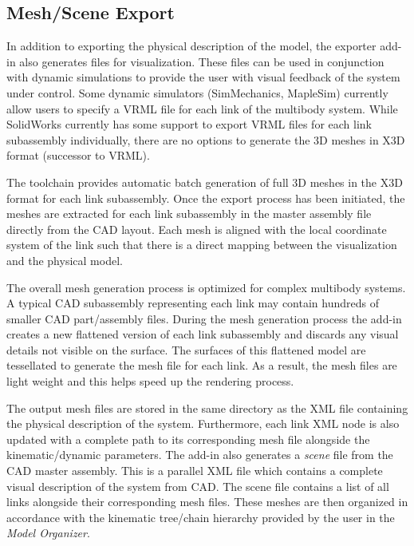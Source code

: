 
\subsection{Mesh/Scene Export} %
\label{sub:mesh_scene_export}
In addition to exporting the physical description of the model, the exporter add-in also generates files for visualization. These files can be used in conjunction with dynamic simulations to provide the user with visual feedback of the system under control. Some dynamic simulators (SimMechanics, MapleSim) currently allow users to specify a VRML file for each link of the multibody system. While SolidWorks currently has some support to export VRML files for each link subassembly individually, there are no options to generate the 3D meshes in X3D format (successor to VRML).

The toolchain provides automatic batch generation of full 3D meshes in the X3D format for each link subassembly. Once the export process has been initiated, the meshes are extracted for each link subassembly in the master assembly file directly from the CAD layout. Each mesh is aligned with the local coordinate system of the link such that there is a direct mapping between the visualization and the physical model.

The overall mesh generation process is optimized for complex multibody systems. A typical CAD subassembly representing each link may contain hundreds of smaller CAD part/assembly files. During the mesh generation process the add-in creates a new flattened version of each link subassembly and discards any visual details not visible on the surface. The surfaces of this flattened model are tessellated to generate the mesh file for each link. As a result, the mesh files are light weight and this helps speed up the rendering process.

The output mesh files are stored in the same directory as the XML file containing the physical description of the system. Furthermore, each link XML node is also updated with a complete path to its corresponding mesh file alongside the kinematic/dynamic parameters. The add-in also generates a \emph{scene} file from the CAD master assembly. This is a parallel XML file which contains a complete visual description of the system from CAD. The scene file contains a list of all links alongside their corresponding mesh files. These meshes are then organized in accordance with the kinematic tree/chain hierarchy provided by the user in the \emph{Model Organizer}.

